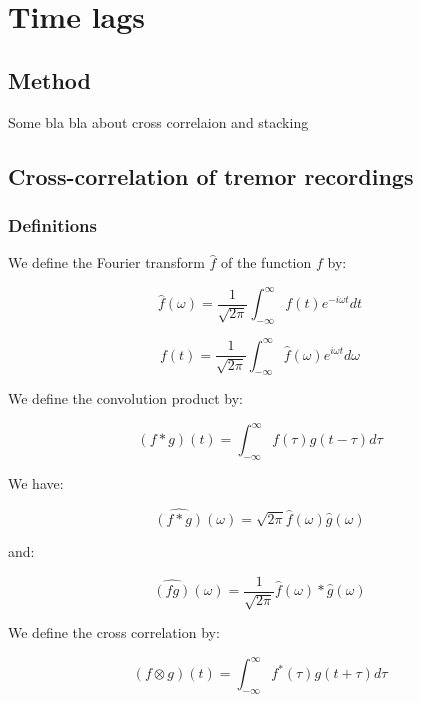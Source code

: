 \documentclass[main.tex]{subfiles}
\begin{document}
\part{Time lags}

\chapter{Method}

Some bla bla about cross correlaion and stacking

\chapter{Cross-correlation of tremor recordings}

\section{Definitions}

We define the Fourier transform $\hat{f}$ of the function $f$ by:

\begin{equation}
\hat{f} (\omega) = \frac{1}{\sqrt{2 \pi}} \int_{- \infty}^{\infty} f(t) e^{-i \omega t} dt
\end{equation}

\begin{equation}
f(t) = \frac{1}{\sqrt{2 \pi}} \int_{- \infty}^{\infty} \hat{f} (\omega) e^{i \omega t} d\omega
\end{equation}

We define the convolution product by:

\begin{equation}
(f * g) (t) = \int_{-\infty}^{\infty} f(\tau) g(t - \tau) d\tau
\end{equation}

We have:

\begin{equation}
\hat{(f * g)} (\omega) = \sqrt{2 \pi} \hat{f} (\omega) \hat{g} (\omega)
\end{equation}

and:

\begin{equation}
\hat{(f g)} (\omega) = \frac{1}{\sqrt{2 \pi}} \hat{f} (\omega) * \hat{g} (\omega)
\end{equation}

We define the cross correlation by:

\begin{equation}
(f \otimes g) (t) = \int_{- \infty}^{\infty} f^* (\tau) g(t + \tau) d\tau
\end{equation}
\end{document}
